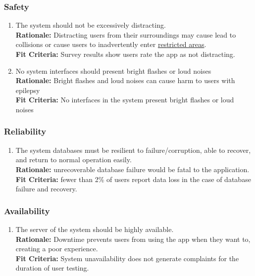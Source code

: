 \documentclass{article}
\begin{document}
\subsubsection{Safety}

\begin{enumerate}[align=left, label=\textbf{QS-SA\arabic*.}]
    \item The system should not be excessively distracting. \\
          {\bf Rationale:} Distracting users from their surroundings may cause lead to collisions or cause users to inadvertently enter \hyperref[def:restricted_area]{restricted areas}.\\
          {\bf Fit Criteria:} Survey results show users rate the app as not distracting.
    \item No system interfaces should present bright flashes or loud noises \\
          {\bf Rationale:} Bright flashes and loud noises can cause harm to users with epilepsy \\
          {\bf Fit Criteria:} No interfaces in the system present bright flashes or loud noises
\end{enumerate}

\subsubsection{Reliability}
\label{sub:reliability}

\begin{enumerate}[align=left, label=\textbf{QS-R\arabic*.}]
    \item The system databases must be resilient to failure/corruption, able to recover, and return to normal operation easily. \\
          {\bf Rationale:} unrecoverable database failure would be fatal to the application. \\
          {\bf Fit Criteria:} fewer than 2\% of users report data loss in the case of database failure and recovery.
\end{enumerate}


\subsubsection{Availability}
\label{sub:availability}

\begin{enumerate}[align=left, label=\textbf{QS-A\arabic*.}]

    \item The server of the system should be highly available. \\
          {\bf Rationale:} Downtime prevents users from using the app when they want to, creating a poor experience. \\
          {\bf Fit Criteria:} System unavailability does not generate complaints for the duration of user testing.
\end{enumerate}
\end{document}
